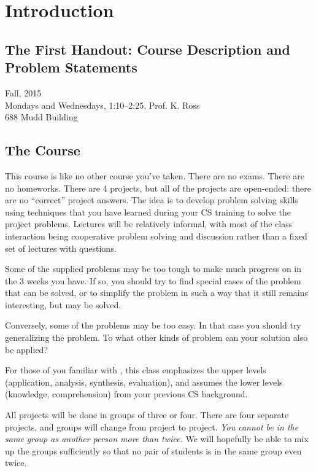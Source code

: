 \section{Introduction}

\subsection{The First Handout: Course Description and Problem Statements}
\begin{center}
Fall, 2015\\
Mondays and Wednesdays, 1:10–2:25, Prof. K. Ross\\
688 Mudd Building
\end{center}

\subsection*{The Course}

This course is like no other course you've taken.  There are no exams.
There are no homeworks.  There are 4 projects, but all of the projects
are open-ended: there are no ``correct'' project answers.  The idea is
to develop problem solving skills using techniques that you have learned
during your CS training to solve the
project problems.  Lectures will be relatively informal, with most
of the class interaction being cooperative problem solving and discussion
rather than a fixed set of lectures with questions.

Some of the supplied problems may be too tough to make much progress on
in the 3 weeks you have.  If so, you should try to find special cases
of the problem that can be solved, or to simplify the problem in
such a way that it still remains interesting, but may be solved.

Conversely, some of the problems may be too easy.  In that case you
should try generalizing the problem.  To what other kinds of problem
can your solution also be applied?

For those of you familiar with , this class
emphasizes the upper levels (application, analysis, synthesis,
evaluation), and assumes the lower levels (knowledge, comprehension)
from your previous CS background.

All projects will be done in groups of three or four.  There are four
separate projects, and groups will change from project to project.
{\em You cannot be in the same group as another person more than
twice.}  We will hopefully be able to mix up the groups sufficiently
so that no pair of students is in the same group even twice.

